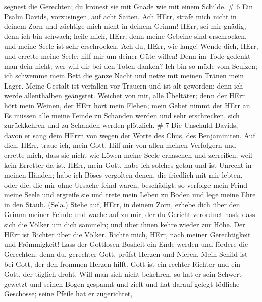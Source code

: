 segnest die Gerechten; du krönest sie mit Gnade wie mit einem Schilde.
\# 6  Ein Psalm Davids, vorzusingen, auf acht Saiten.
 Ach HErr, strafe mich nicht in deinem Zorn und züchtige
mich nicht in deinem Grimm!  HErr, sei mir gnädig, denn ich
bin schwach; heile mich, HErr, denn meine Gebeine sind erschrocken,
 und meine Seele ist sehr erschrocken. Ach du, HErr, wie
lange!  Wende dich, HErr, und errette meine Seele; hilf mir
um deiner Güte willen!  Denn im Tode gedenkt man dein nicht;
wer will dir bei den Toten danken?  Ich bin so müde vom
Seufzen; ich schwemme mein Bett die ganze Nacht und netze mit meinen
Tränen mein Lager.  Meine Gestalt ist verfallen vor Trauern
und ist alt geworden; denn ich werde allenthalben geängstet.
 Weichet von mir, alle Übeltäter; denn der HErr hört mein
Weinen,  der HErr hört mein Flehen; mein Gebet nimmt der
HErr an.  Es müssen alle meine Feinde zu Schanden werden
und sehr erschrecken, sich zurückkehren und zu Schanden werden
plötzlich. \# 7  Die Unschuld Davids, davon er sang dem
HErrn von wegen der Worte des Chus, des Benjaminiten.  Auf
dich, HErr, traue ich, mein Gott. Hilf mir von allen meinen Verfolgern
und errette mich,  dass sie nicht wie Löwen meine Seele
erhaschen und zerreißen, weil kein Erretter da ist.  HErr,
mein Gott, habe ich solches getan und ist Unrecht in meinen Händen;
 habe ich Böses vergolten denen, die friedlich mit mir
lebten, oder die, die mir ohne Ursache feind waren, beschädigt:
 so verfolge mein Feind meine Seele und ergreife sie und
trete mein Leben zu Boden und lege meine Ehre in den Staub. (Sela.)
 Stehe auf, HErr, in deinem Zorn, erhebe dich über den Grimm
meiner Feinde und wache auf zu mir, der du Gericht verordnet hast,
 dass sich die Völker um dich sammeln; und über ihnen kehre
wieder zur Höhe.  Der HErr ist Richter über die Völker.
Richte mich, HErr, nach meiner Gerechtigkeit und Frömmigkeit!
 Lass der Gottlosen Bosheit ein Ende werden und fördere die
Gerechten; denn du, gerechter Gott, prüfst Herzen und Nieren.
 Mein Schild ist bei Gott, der den frommen Herzen hilft.
 Gott ist ein rechter Richter und ein Gott, der täglich
droht.  Will man sich nicht bekehren, so hat er sein
Schwert gewetzt und seinen Bogen gespannt und zielt  und
hat darauf gelegt tödliche Geschosse; seine Pfeile hat er zugerichtet,
